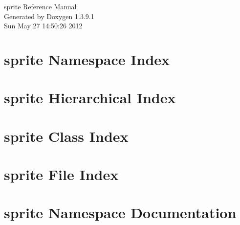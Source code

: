 \documentclass[a4paper]{book}
\begin{document}
\begin{titlepage}
\vspace*{7cm}
\begin{center}
{\Large sprite Reference Manual}\\
\vspace*{1cm}
{\large Generated by Doxygen 1.3.9.1}\\
\vspace*{0.5cm}
{\small Sun May 27 14:50:26 2012}\\
\end{center}
\end{titlepage}
\clearemptydoublepage
{}
\tableofcontents
\clearemptydoublepage
{}
\chapter{sprite Namespace Index}

\chapter{sprite Hierarchical Index}

\chapter{sprite Class Index}

\chapter{sprite File Index}

\chapter{sprite Namespace Documentation}



\end{document}
